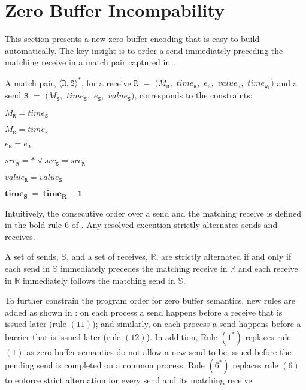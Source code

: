 \section{Zero Buffer Incompability}
This section presents a new zero buffer encoding that is easy to build automatically. 
The key insight is to order a send immediately preceding the matching receive in a match pair captured in .

\begin{definition} \label{def:match*}
A match pair, $\langle\mathtt{R}, \mathtt{S}\rangle^*$, for a receive $\mathtt{R}$ $=$ $(M_\mathtt{R},$ $\mathit{time}_\mathtt{R},$ $e_\mathtt{R},$ $\mathit{value}_\mathtt{R},$ $\mathit{time}_{\mathtt{W}_\mathtt{R}})$ and a send $\mathtt{S}$ $=$ $(M_\mathtt{S},$ $\mathit{time}_\mathtt{S},$ $e_\mathtt{S},$ $\mathit{value}_\mathtt{S})$, corresponds to the constraints:
\begin{compactenum}
\item $M_{\mathtt{R}} = \mathit{time}_{\mathtt{S}}$
\item $M_{\mathtt{S}} = \mathit{time}_{\mathtt{R}}$
\item $e_{\mathtt{R}} = e_{\mathtt{S}}$
\item $src_\mathtt{R} = \ast \vee src_\mathtt{S} = src_\mathtt{R}$
\item $\mathit{value}_{\mathtt{R}} = \mathit{value}_{\mathtt{S}}$ 
\item $\mathit{\textbf{time}}_{\mathtt{\textbf{S}}}\ = \ \mathit{\textbf{time}}_{\mathtt{\textbf{R}}} - \mathit{\textbf{1}}$
\end{compactenum}
\end{definition}

Intuitively, the consecutive order over a send and the matching receive is defined in the bold rule $6$ of . Any resolved execution strictly alternates sends and receives.

\begin{definition}\label{def:alternate}
A set of sends, $\mathbb{S}$, and a set of receives, $\mathbb{R}$, are strictly alternated if and only if each send in $\mathbb{S}$ immediately precedes the matching receive in $\mathbb{R}$ and each receive in $\mathbb{R}$ immediately follows the matching send in $\mathbb{S}$.
\end{definition}
To further constrain the program order for zero buffer semantics, new rules are added as shown in : on each process a send happens before a receive that is issued later (rule $(11)$); and similarly, on each process a send happens before a barrier that is issued later (rule $(12)$). In addition, Rule $(1^*)$ replaces rule $(1)$ as zero buffer semantics do not allow a new send to be issued before the pending send is completed on a common process. Rule $(6^*)$ replaces rule $(6)$ to enforce strict alternation for every send and its matching receive.

